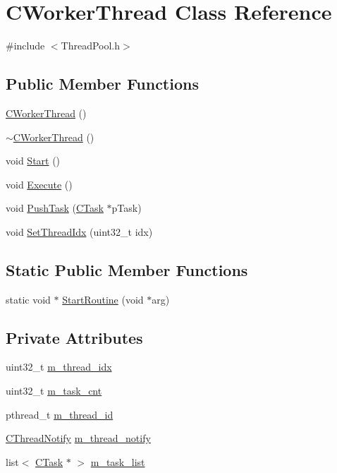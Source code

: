 \hypertarget{class_c_worker_thread}{}\section{C\+Worker\+Thread Class Reference}
\label{class_c_worker_thread}


{\ttfamily \#include $<$Thread\+Pool.\+h$>$}

\subsection*{Public Member Functions}
\begin{DoxyCompactItemize}
\item 
\hyperlink{class_c_worker_thread_a3cff8b7aeb8e0af20c36e519f57e3dbb}{C\+Worker\+Thread} ()
\item 
\hyperlink{class_c_worker_thread_ac48e79f7cc0c6fa81c2600d79142a2d4}{$\sim$\+C\+Worker\+Thread} ()
\item 
void \hyperlink{class_c_worker_thread_abdc1ef43d002b9a3e3c6f560279d9cb8}{Start} ()
\item 
void \hyperlink{class_c_worker_thread_a7cdd9d28a71d0e9a327d9ebb9e3d8a9f}{Execute} ()
\item 
void \hyperlink{class_c_worker_thread_a7ca1bbbdb640a08d3b495c5f515be890}{Push\+Task} (\hyperlink{class_c_task}{C\+Task} $\ast$p\+Task)
\item 
void \hyperlink{class_c_worker_thread_a983b186dc6c2cd4391f25321088a37c8}{Set\+Thread\+Idx} (uint32\+\_\+t idx)
\end{DoxyCompactItemize}
\subsection*{Static Public Member Functions}
\begin{DoxyCompactItemize}
\item 
static void $\ast$ \hyperlink{class_c_worker_thread_af19d8acbb90818ad1fe13f086048110b}{Start\+Routine} (void $\ast$arg)
\end{DoxyCompactItemize}
\subsection*{Private Attributes}
\begin{DoxyCompactItemize}
\item 
uint32\+\_\+t \hyperlink{class_c_worker_thread_a6ad05e65ce3bfc61e96beff6174e7e83}{m\+\_\+thread\+\_\+idx}
\item 
uint32\+\_\+t \hyperlink{class_c_worker_thread_a385829e48904dcec4ba4e20f2ff7348c}{m\+\_\+task\+\_\+cnt}
\item 
pthread\+\_\+t \hyperlink{class_c_worker_thread_ab194208f96403cdd84f6e702c4e07b84}{m\+\_\+thread\+\_\+id}
\item 
\hyperlink{class_c_thread_notify}{C\+Thread\+Notify} \hyperlink{class_c_worker_thread_a9e4adec9400983d9264d157577bffd1c}{m\+\_\+thread\+\_\+notify}
\item 
list$<$ \hyperlink{class_c_task}{C\+Task} $\ast$ $>$ \hyperlink{class_c_worker_thread_a82537d3ed4e3ec766810ecb87fceecd7}{m\+\_\+task\+\_\+list}
\end{DoxyCompactItemize}


